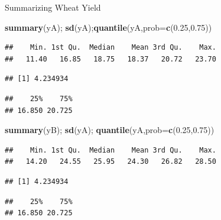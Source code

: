 \documentclass[10pt,ignorenonframetext,]{beamer}
\newenvironment{Shaded}{\begin{snugshade}}{\end{snugshade}}
\newcommand{\KeywordTok}[1]{\textcolor[rgb]{0.13,0.29,0.53}{\textbf{{#1}}}}
\newcommand{\DataTypeTok}[1]{\textcolor[rgb]{0.13,0.29,0.53}{{#1}}}
\newcommand{\FloatTok}[1]{\textcolor[rgb]{0.00,0.00,0.81}{{#1}}}
\newcommand{\NormalTok}[1]{{#1}}
\begin{document}
\begin{frame}[fragile]{Summarizing Wheat Yield}

\begin{Shaded}
\begin{Highlighting}[]
\KeywordTok{summary}\NormalTok{(yA); }\KeywordTok{sd}\NormalTok{(yA);}\KeywordTok{quantile}\NormalTok{(yA,}\DataTypeTok{prob=}\KeywordTok{c}\NormalTok{(}\FloatTok{0.25}\NormalTok{,}\FloatTok{0.75}\NormalTok{))}
\end{Highlighting}
\end{Shaded}

\begin{verbatim}
##    Min. 1st Qu.  Median    Mean 3rd Qu.    Max. 
##   11.40   16.85   18.75   18.37   20.72   23.70
\end{verbatim}

\begin{verbatim}
## [1] 4.234934
\end{verbatim}

\begin{verbatim}
##    25%    75% 
## 16.850 20.725
\end{verbatim}

\begin{Shaded}
\begin{Highlighting}[]
\KeywordTok{summary}\NormalTok{(yB); }\KeywordTok{sd}\NormalTok{(yA); }\KeywordTok{quantile}\NormalTok{(yA,}\DataTypeTok{prob=}\KeywordTok{c}\NormalTok{(}\FloatTok{0.25}\NormalTok{,}\FloatTok{0.75}\NormalTok{))}
\end{Highlighting}
\end{Shaded}

\begin{verbatim}
##    Min. 1st Qu.  Median    Mean 3rd Qu.    Max. 
##   14.20   24.55   25.95   24.30   26.82   28.50
\end{verbatim}

\begin{verbatim}
## [1] 4.234934
\end{verbatim}

\begin{verbatim}
##    25%    75% 
## 16.850 20.725
\end{verbatim}

\end{frame}
\end{document}
